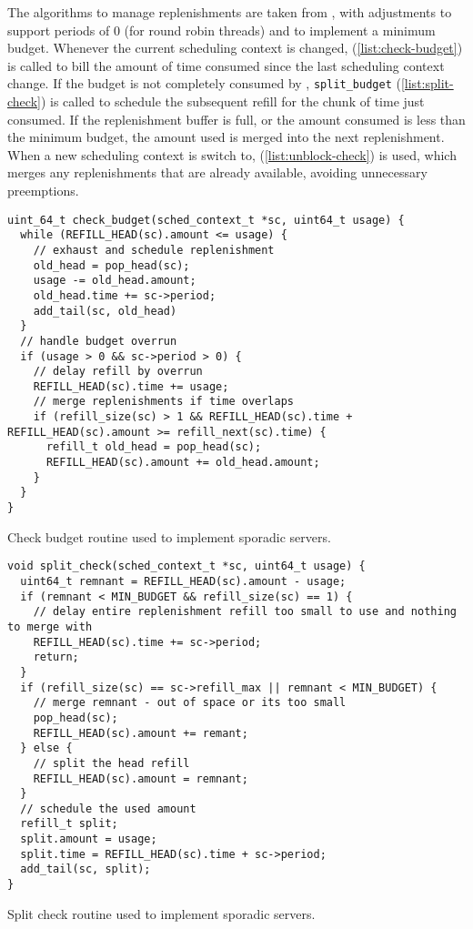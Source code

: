 The algorithms to manage replenishments are taken from \citet{Danish_LW_11}, with adjustments to
support periods of 0 (for round robin threads) and to implement a minimum budget.  Whenever the
current scheduling context is changed,  (\cref{list:check-budget}) is called to bill the amount of time consumed since the last scheduling
context change. If the budget is not completely consumed by ,
\texttt{split\_budget} (\cref{list:split-check}) is called to schedule the
subsequent refill for the chunk of time just consumed.  If the replenishment buffer is full, or the
amount consumed is less than the minimum budget, the amount used is merged into the next
replenishment.  When a new scheduling context is switch to,  
(\cref{list:unblock-check}) is used, which merges any replenishments that are already available,
avoiding unnecessary preemptions.

\begin{listing}[h]
\begin{verbatim}
uint_64_t check_budget(sched_context_t *sc, uint64_t usage) {
  while (REFILL_HEAD(sc).amount <= usage) {
    // exhaust and schedule replenishment
    old_head = pop_head(sc);
    usage -= old_head.amount;
    old_head.time += sc->period;
    add_tail(sc, old_head)
  }
  // handle budget overrun
  if (usage > 0 && sc->period > 0) {
    // delay refill by overrun
    REFILL_HEAD(sc).time += usage;
    // merge replenishments if time overlaps
    if (refill_size(sc) > 1 && REFILL_HEAD(sc).time + REFILL_HEAD(sc).amount >= refill_next(sc).time) {
      refill_t old_head = pop_head(sc);
      REFILL_HEAD(sc).amount += old_head.amount;
    }
  }
}
\end{verbatim}
\caption{Check budget routine used to implement sporadic servers.}
\label{list:check-budget}
\end{listing}

\begin{listing}[h]
\begin{verbatim}
void split_check(sched_context_t *sc, uint64_t usage) {
  uint64_t remnant = REFILL_HEAD(sc).amount - usage;
  if (remnant < MIN_BUDGET && refill_size(sc) == 1) {
    // delay entire replenishment refill too small to use and nothing to merge with
    REFILL_HEAD(sc).time += sc->period;
    return;
  }
  if (refill_size(sc) == sc->refill_max || remnant < MIN_BUDGET) {
    // merge remnant - out of space or its too small
    pop_head(sc);
    REFILL_HEAD(sc).amount += remant;
  } else {
    // split the head refill
    REFILL_HEAD(sc).amount = remnant;
  }
  // schedule the used amount
  refill_t split;
  split.amount = usage;
  split.time = REFILL_HEAD(sc).time + sc->period;
  add_tail(sc, split);
}
\end{verbatim}
\caption{Split check routine used to implement sporadic servers.}
\label{list:split-check}
\end{listing}


